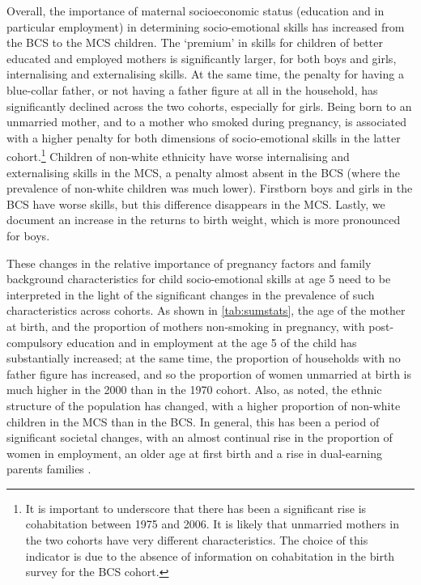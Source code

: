 Overall, the importance of maternal socioeconomic status (education and in particular employment) in determining socio-emotional skills has increased from the BCS to the MCS children. The `premium' in skills for children of better educated and employed mothers is significantly larger, for both boys and girls, internalising and externalising skills. At the same time, the penalty for having a blue-collar father, or not having a father figure at all in the household, has significantly declined across the two cohorts, especially for girls. Being born to an unmarried mother, and to a mother who smoked during pregnancy, is associated with a higher penalty for both dimensions of socio-emotional skills in the latter cohort.\footnote{It is important to underscore that there has been a significant rise is cohabitation between 1975 and 2006. It is likely that unmarried mothers in the two cohorts have very different characteristics. The choice of this indicator is due to the absence of information on cohabitation in the birth survey for the BCS cohort.} Children of non-white ethnicity have worse internalising and externalising skills in the MCS, a penalty almost absent in the BCS (where the prevalence of non-white children was much lower). Firstborn boys and girls in the BCS have worse skills, but this difference disappears in the MCS. Lastly, we document an increase in the returns to birth weight, which is more pronounced for boys.

These changes in the relative importance of pregnancy factors and family background characteristics for child socio-emotional skills at age 5 need to be interpreted in the light of the significant changes in the prevalence of such characteristics across cohorts. As shown in \autoref{tab:sumstats}, the age of the mother at birth, and the proportion of mothers non-smoking in pregnancy, with post-compulsory education and in employment at the age 5 of the child has substantially increased; at the same time, the proportion of households with no father figure has increased, and so the proportion of women unmarried at birth is much higher in the 2000 than in the 1970 cohort. Also, as noted, the ethnic structure of the population has changed, with a higher proportion of non-white children in the MCS than in the BCS. In general, this has been a period of significant societal changes, with an almost continual rise in the proportion of women in employment, an older age at first birth and a rise in dual-earning parents families \citep{Roantree2018}.

